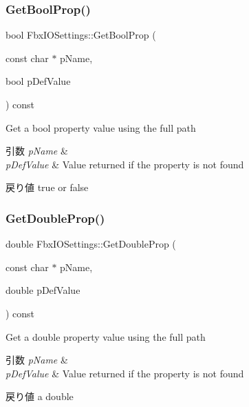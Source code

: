 \mbox{\label{class_fbx_i_o_settings_aa30a3e515f60aa1fcbd82b6b34994ad0}} 
\subsubsection{\texorpdfstring{Get\+Bool\+Prop()}{GetBoolProp()}}
{\footnotesize\ttfamily bool Fbx\+I\+O\+Settings\+::\+Get\+Bool\+Prop (\begin{DoxyParamCaption}\item[{const char $\ast$}]{p\+Name,  }\item[{bool}]{p\+Def\+Value }\end{DoxyParamCaption}) const}

Get a bool property value using the full path 
\begin{DoxyParams}{引数}
{\em p\+Name} & \\
\hline
{\em p\+Def\+Value} & Value returned if the property is not found \\
\hline
\end{DoxyParams}
\begin{DoxyReturn}{戻り値}
true or false 
\end{DoxyReturn}
\mbox{\label{class_fbx_i_o_settings_a4d068caa98d8183a45b520d6ade6ad41}} 
\subsubsection{\texorpdfstring{Get\+Double\+Prop()}{GetDoubleProp()}}
{\footnotesize\ttfamily double Fbx\+I\+O\+Settings\+::\+Get\+Double\+Prop (\begin{DoxyParamCaption}\item[{const char $\ast$}]{p\+Name,  }\item[{double}]{p\+Def\+Value }\end{DoxyParamCaption}) const}

Get a double property value using the full path 
\begin{DoxyParams}{引数}
{\em p\+Name} & \\
\hline
{\em p\+Def\+Value} & Value returned if the property is not found \\
\hline
\end{DoxyParams}
\begin{DoxyReturn}{戻り値}
a double 
\end{DoxyReturn}
\mbox{\label{class_fbx_i_o_settings_a0d328ff98e1cce8d911e78cfe83aa662}} 
